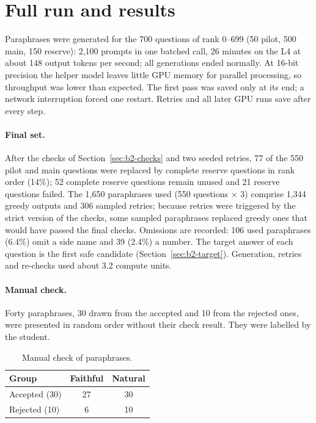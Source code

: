 \documentclass[11pt,a4paper]{report}
\begin{document}
\section{Full run and results}\label{sec:b2-results}
Paraphrases were generated for the 700 questions of rank 0--699 (50 pilot,
500 main, 150 reserve): 2{,}100 prompts in one batched call, 26 minutes on the
L4 at about 148 output tokens per second; all generations ended normally. At
16-bit precision the helper model leaves little GPU memory for parallel
processing, so throughput was lower than expected. The first pass was saved
only at its end; a network interruption forced one restart. Retries and all
later GPU runs save after every step.

\paragraph{Final set.}
After the checks of Section~\ref{sec:b2-checks} and two seeded retries, 77 of
the 550 pilot and main questions were replaced by complete reserve questions
in rank order (14\%); 52 complete reserve questions remain unused and 21
reserve questions failed. The 1{,}650 paraphrases used (550 questions
$\times$ 3) comprise 1{,}344 greedy outputs and 306 sampled retries; because
retries were triggered by the strict version of the checks, some sampled
paraphrases replaced greedy ones that would have passed the final checks.
Omissions are recorded: 106 used paraphrases (6.4\%) omit a side name and 39
(2.4\%) a number. The target answer of each question is the first safe
candidate (Section~\ref{sec:b2-target}). Generation, retries and re-checks
used about 3.2 compute units.

\paragraph{Manual check.}
Forty paraphrases, 30 drawn from the accepted and 10 from the rejected ones,
were presented in random order without their check result. They were labelled
by the student.

\begin{table}[h]
\centering\small
\begin{tabular}{@{}lcc@{}}
\toprule
Group & Faithful & Natural \\
\midrule
Accepted (30) & 27 & 30 \\
Rejected (10) & 6 & 10 \\
\bottomrule
\end{tabular}
\caption{Manual check of paraphrases.}
\label{tab:b2-manual}
\end{table}
\end{document}
